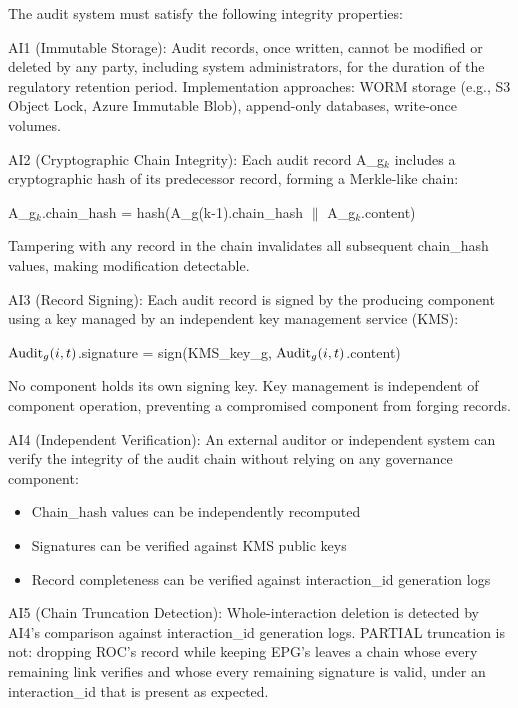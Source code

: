 \begin{cdef}
The audit system must satisfy the following integrity properties:

AI1 (Immutable Storage): Audit records, once written, cannot be modified or deleted by any party, including system administrators, for the duration of the regulatory retention period. Implementation approaches: WORM storage (e.g., S3 Object Lock, Azure Immutable Blob), append-only databases, write-once volumes.

AI2 (Cryptographic Chain Integrity): Each audit record A\_\allowbreak{}g$_k$ includes a cryptographic hash of its predecessor record, forming a Merkle-like chain:

A\_\allowbreak{}g$_k$.chain\_\allowbreak{}hash = hash(A\_\allowbreak{}g(k-1).chain\_\allowbreak{}hash $\parallel$ A\_\allowbreak{}g$_k$.content)

Tampering with any record in the chain invalidates all subsequent chain\_\allowbreak{}hash values, making modification detectable.

AI3 (Record Signing): Each audit record is signed by the producing component using a key managed by an independent key management service (KMS):

$\operatorname{Audit}_g(i,t)$.signature = sign(KMS\_\allowbreak{}key\_\allowbreak{}g, $\operatorname{Audit}_g(i,t)$.content)

No component holds its own signing key. Key management is
independent of component operation, preventing a compromised component from forging records.

AI4 (Independent Verification): An external auditor or independent system can verify the integrity of the audit chain without relying on any governance component:
\begin{itemize}
  \item Chain\_\allowbreak{}hash values can be independently recomputed
  \item Signatures can be verified against KMS public keys
  \item Record completeness can be verified against interaction\_\allowbreak{}id generation logs
\end{itemize}

AI5 (Chain Truncation Detection): Whole-interaction deletion is detected by AI4's comparison against interaction\_\allowbreak{}id generation logs. PARTIAL truncation is not: dropping ROC's record while keeping EPG's leaves a chain whose every remaining link verifies and whose every remaining signature is valid, under an interaction\_\allowbreak{}id that is present as expected.


\end{cdef}
